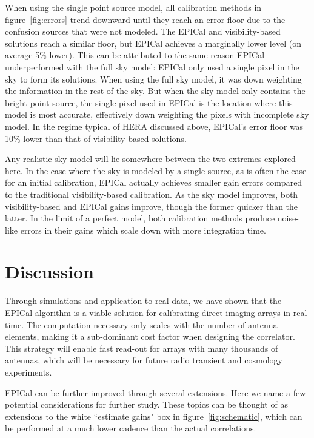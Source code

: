\documentclass[a4paper,fleqn,usenatbib]{mnras}
\begin{document}
When using the single point source model, all calibration methods in figure~\ref{fig:errors} trend downward until they reach an error floor due to the confusion sources that were not modeled. The EPICal and visibility-based solutions reach a similar floor, but EPICal achieves a marginally lower level (on average 5\% lower). This can be attributed to the same reason EPICal underperformed with the full sky model: EPICal only used a single pixel in the sky to form its solutions. When using the full sky model, it was down weighting the information in the rest of the sky. But when the sky model only contains the bright point source, the single pixel used in EPICal is the location where this model is most accurate, effectively down weighting the pixels with incomplete sky model. In the regime typical of HERA discussed above, EPICal's error floor was 10\% lower than that of visibility-based solutions.

Any realistic sky model will lie somewhere between the two extremes explored here. In the case where the sky is modeled by a single source, as is often the case for an initial calibration, EPICal actually achieves smaller gain errors compared to the traditional visibility-based calibration. As the sky model improves, both visibility-based and EPICal gains improve, though the former quicker than the latter. In the limit of a perfect model, both calibration methods produce noise-like errors in their gains which scale down with more integration time.

\section{Discussion}\label{sec:discussion}
Through simulations and application to real data, we have shown that the EPICal algorithm is a viable solution for calibrating direct imaging arrays in real time. The computation necessary only scales with the number of antenna elements, making it a sub-dominant cost factor when designing the correlator. This strategy will enable fast read-out for arrays with many thousands of antennas, which will be necessary for future radio transient and cosmology experiments.

EPICal can be further improved through several extensions. Here we name a few potential considerations for further study. These topics can be thought of as extensions to the white ``estimate gains" box in figure~\ref{fig:schematic}, which can be performed at a much lower cadence than the actual correlations.
\end{document}
